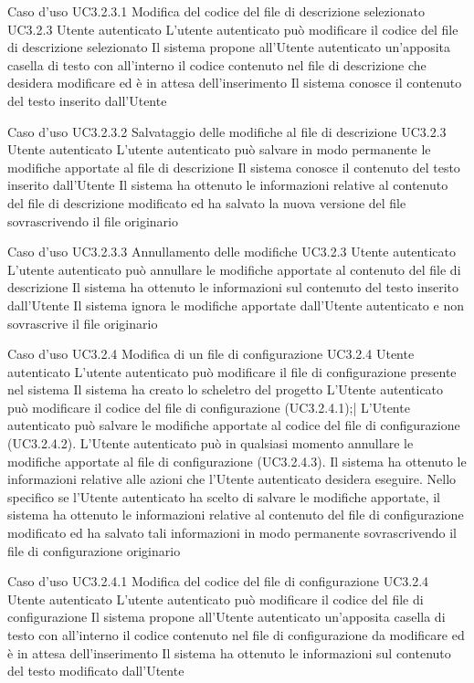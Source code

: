 \UCtitle
{Caso d'uso UC3.2.3.1}
{Modifica del codice del file di descrizione selezionato}
\UC
{UC3.2.3}
{Utente autenticato}
{L'utente autenticato può modificare il codice del file di descrizione selezionato}
{Il sistema propone all'Utente autenticato un'apposita casella di testo con all'interno il codice contenuto nel file di descrizione che desidera modificare ed è in attesa dell'inserimento}
\post
{Il sistema conosce il contenuto del testo inserito dall'Utente}

\UCtitle
{Caso d'uso UC3.2.3.2}
{Salvataggio delle modifiche al file di descrizione}
\UC
{UC3.2.3}
{Utente autenticato}
{L'utente autenticato può salvare in modo permanente le modifiche apportate al file di descrizione}
{Il sistema conosce il contenuto del testo inserito dall'Utente}
\post
{Il sistema ha ottenuto le informazioni relative al contenuto del file di descrizione modificato ed ha salvato la nuova versione del file sovrascrivendo il file originario}

\UCtitle
{Caso d'uso UC3.2.3.3}
{Annullamento delle modifiche}
\UC
{UC3.2.3}
{Utente autenticato}
{L'utente autenticato può annullare le modifiche apportate al contenuto del file di descrizione}
{Il sistema ha ottenuto le informazioni sul contenuto del testo inserito dall'Utente}
\post
{Il sistema ignora le modifiche apportate dall'Utente autenticato e non sovrascrive il file originario}


\UCtitle
{Caso d'uso UC3.2.4}
{Modifica di un file di configurazione}
\UC
{UC3.2.4}
{Utente autenticato}
{L'utente autenticato può modificare il file di configurazione presente nel sistema}
{Il sistema ha creato lo scheletro del progetto}
\scenario
{L'Utente autenticato può modificare il codice del file di configurazione (UC3.2.4.1);|
L'Utente autenticato può salvare le modifiche apportate al codice del file di configurazione (UC3.2.4.2).
}
\estensioni
{L'Utente autenticato può in qualsiasi momento annullare le modifiche apportate al file di configurazione (UC3.2.4.3).}
\post
{Il sistema ha ottenuto le informazioni relative alle azioni che l'Utente autenticato desidera eseguire. Nello specifico se l'Utente autenticato ha scelto di salvare le modifiche apportate, il sistema ha ottenuto le informazioni relative al contenuto del file di configurazione modificato ed ha salvato tali informazioni in modo permanente sovrascrivendo il file di configurazione originario}

\UCtitle
{Caso d'uso UC3.2.4.1}
{Modifica del codice del file di configurazione}
\UC
{UC3.2.4}
{Utente autenticato}
{L'utente autenticato può modificare il codice del file di configurazione}
{Il sistema propone all'Utente autenticato un'apposita casella di testo con all'interno il codice contenuto nel file di configurazione da modificare ed è in attesa dell'inserimento}
\post
{Il sistema ha ottenuto le informazioni sul contenuto del testo modificato dall'Utente}

